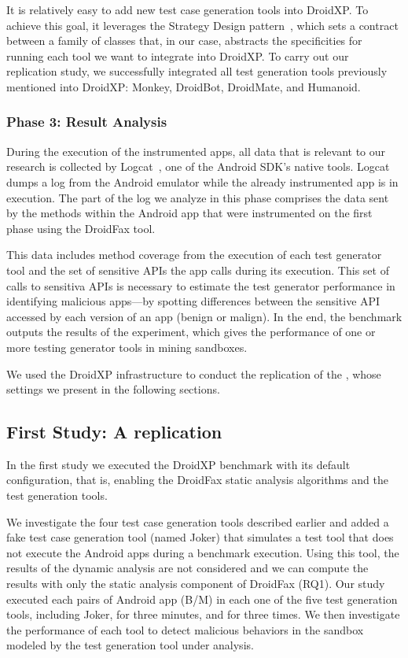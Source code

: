 It is relatively easy to add new test
case generation tools into DroidXP. To achieve this goal, it leverages the Strategy Design
pattern~\cite{patterns-book}, which sets a contract between a family of classes that, in our case, abstracts the specificities
for running each tool we want to integrate into DroidXP.
To carry out our replication study, we successfully integrated all
test generation tools previously mentioned into DroidXP: Monkey, DroidBot, DroidMate, and
Humanoid. 

\subsubsection{Phase 3: Result Analysis}

During the execution of the instrumented apps, all data that is relevant to our
research is collected by Logcat~\cite{Logcat}, one of the Android SDK's native tools. Logcat dumps a log from the Android emulator
while the already instrumented app is in execution. The part of the log we analyze in this phase comprises
the data sent by the methods within the Android app that were instrumented on the first
phase using the DroidFax tool. 

This data includes method coverage from the execution of each test generator tool and the
set of sensitive APIs the app calls during its execution. This set of calls to
sensitiva APIs is necessary to estimate the test generator performance in identifying malicious apps---by spotting
differences between the sensitive API accessed by each version of an app (benign or malign).
In the end, the benchmark outputs the results of the experiment, which gives the
performance of one or more testing generator tools in mining sandboxes.

We used the DroidXP infrastructure to conduct the replication of
the \blls, whose settings we present in the following sections. 

\subsection{First Study: A replication \blls}

In the first study we executed the DroidXP benchmark with its
default configuration, that is, enabling the DroidFax
static analysis algorithms and the test generation tools.

We investigate the four test case generation tools described earlier and added a fake test
case generation tool (named Joker) that simulates a test tool that does not execute
the Android apps during a benchmark execution. Using this tool, the results
of the dynamic analysis are not considered and we can compute the results with
only the static analysis component of DroidFax (RQ1). Our study executed each pairs of
Android app (B/M) in each one of the five test generation tools, including Joker,
for three minutes, and for three times. We then investigate the performance of each tool to detect malicious behaviors in the sandbox modeled by the test generation tool
under analysis. 

